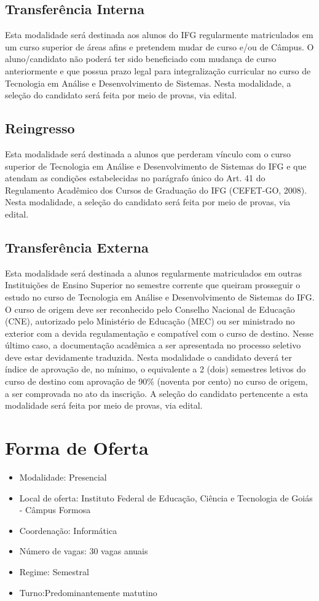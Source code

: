 \documentclass[11pt,fleqn]{book} %
\begin{document}
\subsection{Transferência Interna}
Esta modalidade será destinada aos alunos do IFG regularmente matriculados em um curso superior de áreas afins e pretendem mudar de curso e/ou de Câmpus. O aluno/candidato não poderá ter sido beneficiado com mudança de curso anteriormente e que possua prazo legal para integralização curricular no curso de Tecnologia em Análise e Desenvolvimento de Sistemas. Nesta modalidade, a seleção do candidato será feita por meio de provas, via edital.

\subsection{Reingresso}
Esta modalidade será destinada a alunos que perderam vínculo com o curso superior de Tecnologia em Análise e Desenvolvimento de Sistemas do IFG e que atendam as condições estabelecidas no parágrafo único do Art. 41 do Regulamento Acadêmico dos Cursos de Graduação do IFG (CEFET-GO, 2008).
Nesta modalidade, a seleção do candidato será feita por meio de provas, via edital.

\subsection{Transferência Externa}
Esta modalidade será destinada a alunos regularmente matriculados em outras Instituições de Ensino Superior no semestre corrente que queiram prosseguir o estudo no curso de Tecnologia em Análise e Desenvolvimento de Sistemas do IFG. 
O curso de origem deve ser reconhecido pelo Conselho Nacional de Educação (CNE), autorizado pelo Ministério de Educação (MEC) ou ser ministrado no exterior com a devida regulamentação e compatível com o curso de destino. 
Nesse último caso, a documentação acadêmica a ser apresentada no processo seletivo deve estar devidamente traduzida.
Nesta modalidade o candidato deverá ter índice de aprovação de, no mínimo, o equivalente a 2 (dois) semestres letivos do curso de destino com aprovação de 90\% (noventa por cento) no curso de origem, a ser comprovada no ato da inscrição.
A seleção do candidato pertencente a esta modalidade será feita por meio de provas, via edital.

\section{Forma de Oferta}\label{carga}
\begin{itemize}
	\item Modalidade: Presencial
	\item Local de oferta: Instituto Federal de Educação, Ciência e Tecnologia de Goiás - Câmpus Formosa
	\item Coordenação: Informática
	\item Número de vagas: 30 vagas anuais
	\item Regime: Semestral
	\item Turno:Predominantemente matutino
\end{itemize}
\end{document}
